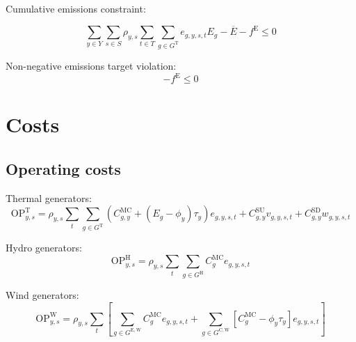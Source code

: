 \documentclass{article}
\newcommand{\sGeneratorsExistingThermal}{G^{\mathrm{E,T}}}
\newcommand{\sGeneratorsExistingWind}{G^{\mathrm{E,W}}}
\newcommand{\sGeneratorsCandidate}{G^{\mathrm{C}}}
\newcommand{\sGeneratorsCandidateWind}{G^{\mathrm{C,W}}}
\newcommand{\sGeneratorsThermal}{G^{\mathrm{T}}}
\newcommand{\sGeneratorsHydro}{G^{\mathrm{H}}}
\newcommand{\sYears}{Y}
\newcommand{\sScenarios}{S}
\newcommand{\sIntervals}{T}
\newcommand{\iGenerator}{g}
\newcommand{\iYear}{y}
\newcommand{\iScenario}{s}
\newcommand{\iInterval}{t}
\newcommand{\cOperatingCostThermal}[1][\iYear,\iScenario]{\mathrm{OP}^{\mathrm{T}}_{#1}}
\newcommand{\cOperatingCostHydro}[1][\iYear,\iScenario]{\mathrm{OP}^{\mathrm{H}}_{#1}}
\newcommand{\cOperatingCostWind}[1][\iYear,\iScenario]{\mathrm{OP}^{\mathrm{W}}_{#1}}
\newcommand{\cScenarioDuration}[1][\iYear,\iScenario]{\rho_{#1}}
\newcommand{\cMarginalCost}[1][\iGenerator,\iYear]{C^{\mathrm{MC}}_{#1}}
\newcommand{\cStartupCost}[1][\iGenerator,\iYear]{C^{\mathrm{SU}}_{#1}}
\newcommand{\cShutdownCost}[1][\iGenerator,\iYear]{C^{\mathrm{SD}}_{#1}}
\newcommand{\cEmissionsIntensity}[1][\iGenerator]{E_{#1}}
\newcommand{\cEmmissionsCumulativeTarget}{\overline{E}}
\newcommand{\cSchemeRevenueCumulativeTarget}{\overline{R}}
\newcommand{\vBaseline}[1][\iYear]{\phi_{#1}}
\newcommand{\vPermitPrice}[1][\iYear]{\tau_{#1}}
\newcommand{\vEnergy}[1][\iGenerator,\iYear,\iScenario,\iInterval]{e_{#1}}
\newcommand{\vStartupIndicator}[1][\iGenerator,\iYear,\iScenario,\iInterval]{v_{#1}}
\newcommand{\vShutdownIndicator}[1][\iGenerator,\iYear,\iScenario,\iInterval]{w_{#1}}
\newcommand{\vEmissionsTargetViolation}{f^{\mathrm{E}}}
\begin{document}
Cumulative emissions constraint:

\begin{equation}
\sum\limits_{\iYear \in \sYears} \sum\limits_{\iScenario \in \sScenarios} \cScenarioDuration \sum\limits_{\iInterval \in \sIntervals} \sum\limits_{\iGenerator \in \sGeneratorsThermal} \vEnergy \cEmissionsIntensity - \cEmmissionsCumulativeTarget - \vEmissionsTargetViolation \leq 0
\label{eqn: cumulative emissions target}
\end{equation}

Non-negative emissions target violation:
\begin{equation}
	-\vEmissionsTargetViolation \leq 0
	\label{eqn: non negative emissions target violation}
\end{equation}

%

\section{Costs}
\subsection{Operating costs}
Thermal generators:
\begin{equation}
	\cOperatingCostThermal = \cScenarioDuration\sum\limits_{\iInterval}\sum\limits_{\iGenerator \in \sGeneratorsThermal} (\cMarginalCost + (\cEmissionsIntensity - \vBaseline)\vPermitPrice)\vEnergy + \cStartupCost \vStartupIndicator + \cShutdownCost \vShutdownIndicator
\end{equation}

Hydro generators:
\begin{equation}
	\cOperatingCostHydro = \cScenarioDuration\sum\limits_{\iInterval}\sum\limits_{\iGenerator \in \sGeneratorsHydro}\cMarginalCost[\iGenerator] \vEnergy
\end{equation}

Wind generators:
\begin{equation}
	\cOperatingCostWind = \cScenarioDuration\sum\limits_{\iInterval}\left[\sum\limits_{\iGenerator \in \sGeneratorsExistingWind} \cMarginalCost[\iGenerator] \vEnergy + \sum\limits_{\iGenerator \in \sGeneratorsCandidateWind} \left[\cMarginalCost[\iGenerator] - \vBaseline \vPermitPrice\right] \vEnergy\right]
\end{equation}
\end{document}
